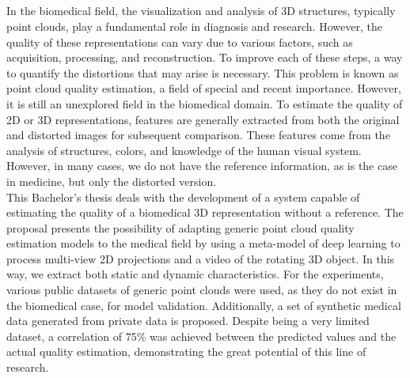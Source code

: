 \cleardoublepage


\thispagestyle{empty}


\begin{center}
{\large\bfseries \myTitleENG}\\
\end{center}
\begin{center}
\myName \\
\end{center}

\\

\\

In the biomedical field, the visualization and analysis of 3D structures, 
typically point clouds, play a fundamental role in diagnosis and research. 
However, the quality of these representations can vary due to various factors, 
such as acquisition, processing, and reconstruction. 
To improve each of these steps, a way to quantify the distortions that may 
arise is necessary. This problem is known as point cloud quality estimation, 
a field of special and recent importance. However, it is still an unexplored 
field in the biomedical domain.
To estimate the quality of 2D or 3D representations, features are generally 
extracted from both the original and distorted images for subsequent comparison. 
These features come from the analysis of structures, colors, and knowledge of 
the human visual system. However, in many cases, we do not have the reference 
information, as is the case in medicine, but only the distorted version.
\\

This Bachelor's thesis deals with the development of a system capable of estimating 
the quality of a biomedical 3D representation without a reference. The proposal 
presents the possibility of adapting generic point cloud quality estimation models 
to the medical field by using a meta-model of deep learning to process multi-view 
2D projections and a video of the rotating 3D object. In this way, 
we extract both static and dynamic characteristics.
For the experiments, various public datasets of generic point clouds were used, 
as they do not exist in the biomedical case, for model validation. 
Additionally, a set of synthetic medical data generated from private data is proposed. 
Despite being a very limited dataset, a correlation of 75\% was achieved between 
the predicted values and the actual quality estimation, demonstrating the great potential of this line of research.

